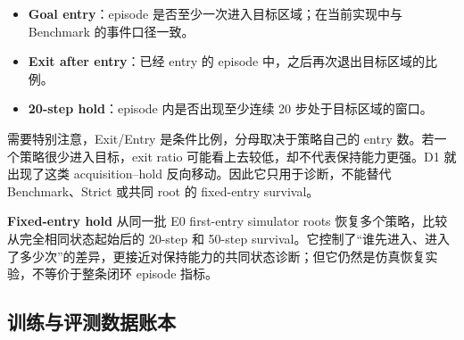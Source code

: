 \begin{itemize}
\tightlist
\item
  \textbf{Goal entry}：episode 是否至少一次进入目标区域；在当前实现中与 Benchmark 的事件口径一致。
\item
  \textbf{Exit after entry}：已经 entry 的 episode 中，之后再次退出目标区域的比例。
\item
  \textbf{20-step hold}：episode 内是否出现至少连续 20 步处于目标区域的窗口。
\end{itemize}

需要特别注意，Exit/Entry 是条件比例，分母取决于策略自己的 entry 数。若一个策略很少进入目标，exit ratio 可能看上去较低，却不代表保持能力更强。D1 就出现了这类 acquisition--hold 反向移动。因此它只用于诊断，不能替代 Benchmark、Strict 或共同 root 的 fixed-entry survival。

\textbf{Fixed-entry hold} 从同一批 E0 first-entry simulator roots 恢复多个策略，比较从完全相同状态起始后的 20-step 和 50-step survival。它控制了``谁先进入、进入了多少次''的差异，更接近对保持能力的共同状态诊断；但它仍然是仿真恢复实验，不等价于整条闭环 episode 指标。

\hypertarget{ux8badux7ec3ux4e0eux8bc4ux6d4bux6570ux636eux8d26ux672c}{%
\subsection{训练与评测数据账本}\label{ux8badux7ec3ux4e0eux8bc4ux6d4bux6570ux636eux8d26ux672c}}

